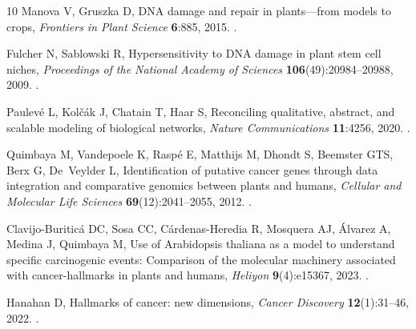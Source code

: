 \documentclass{ws-jbcb}
\numberwithin{equation}{section}
\begin{document}
\begin{thebibliography}{10}
Manova V, Gruszka D, {DNA} damage and repair in plants---from models to crops,
  \emph{Frontiers in Plant Science} \textbf{6}:885, 2015.
\newblock {}.

Fulcher N, Sablowski R, Hypersensitivity to {DNA} damage in plant stem cell
  niches, \emph{Proceedings of the National Academy of Sciences}
  \textbf{106}(49):20984--20988, 2009.
\newblock {}.

Paulev{\'e} L, Kol{\v{c}}{\'a}k J, Chatain T, Haar S, Reconciling qualitative,
  abstract, and scalable modeling of biological networks, \emph{Nature
  Communications} \textbf{11}:4256, 2020.
\newblock {}.

Quimbaya M, Vandepoele K, Rasp{\'e} E, Matthijs M, Dhondt S, Beemster GTS, Berx
  G, De~Veylder L, Identification of putative cancer genes through data
  integration and comparative genomics between plants and humans,
  \emph{Cellular and Molecular Life Sciences} \textbf{69}(12):2041--2055, 2012.
\newblock {}.

Clavijo-Buritic\'a DC, Sosa CC, C\'ardenas-Heredia R, Mosquera AJ, \'Alvarez A,
  Medina J, Quimbaya M, Use of {Arabidopsis thaliana} as a model to understand
  specific carcinogenic events: Comparison of the molecular machinery
  associated with cancer-hallmarks in plants and humans, \emph{Heliyon}
  \textbf{9}(4):e15367, 2023.
\newblock {}.

Hanahan D, Hallmarks of cancer: new dimensions, \emph{Cancer Discovery}
  \textbf{12}(1):31--46, 2022.
\newblock {}.

\end{thebibliography}
\end{document}
